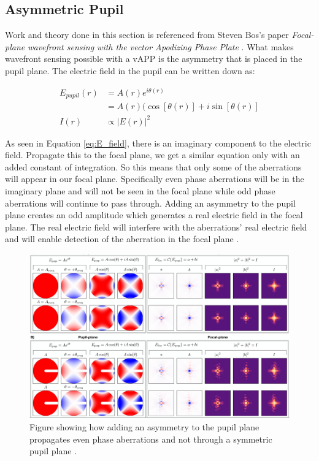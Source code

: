\subsection{Asymmetric Pupil}
\label{sec:asym_pupil}

Work and theory done in this section is referenced from Steven Bos's paper \textit{Focal-plane wavefront sensing with the vector Apodizing Phase Plate} \cite{Bos2019Focal-planePlate}.
What makes wavefront sensing possible with a vAPP is the asymmetry that is placed in the pupil plane.  The electric field in the pupil can be written down as:

\begin{align}
    E_{pupil}(r) &= A(r) e^{i \theta(r)} \\
    &= A(r) (\cos[\theta (r)] + i\sin[\theta (r)] \label{eq:E_field} \\ 
    I(r) &\propto |E(r)|^2 \label{eq:I_E}
\end{align}

As seen in Equation \ref{eq:E_field}, there is an imaginary component to the electric field.  Propagate this to the focal plane, we get a similar equation only with an added constant of integration.  So this means that only some of the aberrations will appear in our focal plane.  Specifically even phase aberrations will be in the imaginary plane and will not be seen in the focal plane while odd phase aberrations will continue to pass through.  Adding an asymmetry to the pupil plane creates an odd amplitude which generates a real electric field in the focal plane.  The real electric field will interfere with the aberrations' real electric field and will enable detection of the aberration in the focal plane \cite{Bos2019Focal-planePlate}.



\begin{figure}[H]
\centering
\includegraphics[width=14 cm]{Figures/asymmetry.png}
\caption{Figure showing how adding an asymmetry to the pupil plane propagates even phase aberrations and not through a symmetric pupil plane \cite{Bos2019Focal-planePlate}.}
\label{fig:asymm}
\end{figure}


